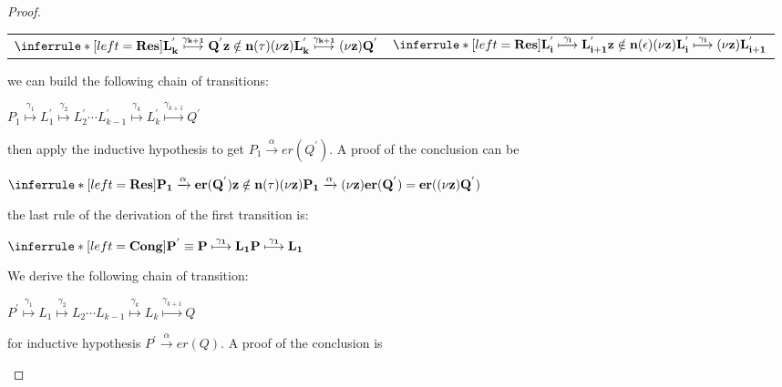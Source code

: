 \begin{proposition}
\begin{proof}
\begin{description}
\begin{description}
	    \begin{center}
	      \begin{tabular}{ll}
		$\inferrule* [left=\bf{Res}]{
 			L_{k}^{'} \stackrel{\gamma_{k+1}}{\longmapsto} Q^{'}
 		      \\
 			z\notin n(\tau)
 		    }{
 		      (\nu z)L_{k}^{'} \stackrel{\gamma_{k+1}}{\longmapsto} (\nu z)Q^{'}
 		}$
		&
		$\inferrule* [left=\bf{Res}]{
 			L_{i}^{'} \stackrel{\gamma_{i}}{\longmapsto} L_{i+1}^{'}
 		      \\
 			z\notin n(\epsilon)
 		}{
 		      (\nu z)L_{i}^{'} \stackrel{\gamma_{i}}{\longmapsto} (\nu z)L_{i+1}^{'}
 		}$
	      \end{tabular}
	    \end{center}
	    we can build the following chain of transitions:
	    \begin{center}
	      $P_{1} 
		\stackrel{\gamma_{1}}{\longmapsto} 
		  L_{1}^{'} 
		    \stackrel{\gamma_{2}}{\longmapsto} 
		      L_{2}^{'} 
			\cdots 
			  L_{k-1}^{'} 
			    \stackrel{\gamma_{k}}{\longmapsto} 
			      L_{k}^{'}
				\stackrel{\gamma_{k+1}}{\longmapsto} 
				  Q^{'}$ 
	    \end{center}
	    then apply the inductive hypothesis to get $P_{1} \xrightarrow{\alpha} er(Q^{'})$. A proof of the conclusion can be
	    \begin{center}
	      $\inferrule* [left=\bf{Res}]{
		  P_{1} \xrightarrow{\alpha} er(Q^{'})
		\\
		  z\notin n(\tau)
	      }{
		(\nu z)P_{1} \xrightarrow{\alpha} (\nu z)er(Q^{'})=er((\nu z)Q^{'})
	      }$
	    \end{center}
	  \item[$Cong$]
	    the last rule of the derivation of the first transition is:
	    \begin{center}
	      $\inferrule* [left=\bf{Cong}]{
		  P^{'} \equiv P
		\\
		  \stackrel{\gamma_{1}}{\longmapsto} L_{1}
	      }{
		P \stackrel{\gamma_{1}}{\longmapsto} L_{1}
	      }$ 		      
	    \end{center}
	    We derive the following chain of transition:
	    \begin{center}
 		  $P^{'} 
 		    \stackrel{\gamma_{1}}{\longmapsto} 
 		      L_{1} 
 			\stackrel{\gamma_{2}}{\longmapsto} 
 			  L_{2} 
 			    \cdots 
 			      L_{k-1} 
 				\stackrel{\gamma_{k}}{\longmapsto} 
 				  L_{k}
 				    \stackrel{\gamma_{k+1}}{\longmapsto} 
 				      Q$
	    \end{center}
	    for inductive hypothesis $P^{'} \xrightarrow{\alpha} er(Q)$. A proof of the conclusion is

\end{description}
\end{description}
\end{proof}
\end{proposition}
